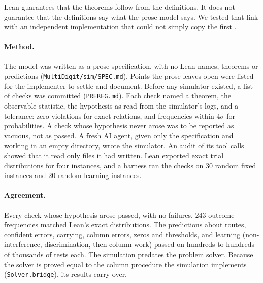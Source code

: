 \documentclass[11pt]{article}
\newcommand{\code}[1]{\texttt{#1}}
\newcommand{\lean}[1]{\texttt{#1}}
\begin{document}
Lean guarantees that the theorems follow from the definitions. It does not guarantee that the definitions say what the prose model says. We tested that link with an independent implementation that could not simply copy the first \citep[cf. N-version programming,][]{avizienis1985}.

\paragraph{Method.} The model was written as a prose specification, with no Lean names, theorems or predictions (\code{MultiDigit/sim/SPEC.md}). Points the prose leaves open were listed for the implementer to settle and document. Before any simulator existed, a list of checks was committed (\code{PREREG.md}). Each check named a theorem, the observable statistic, the hypothesis as read from the simulator's logs, and a tolerance: zero violations for exact relations, and frequencies within $4\sigma$ for probabilities. A check whose hypothesis never arose was to be reported as vacuous, not as passed. A fresh AI agent, given only the specification and working in an empty directory, wrote the simulator. An audit of its tool calls showed that it read only files it had written. Lean exported exact trial distributions for four instances, and a harness ran the checks on 30 random fixed instances and 20 random learning instances.

\paragraph{Agreement.} Every check whose hypothesis arose passed, with no failures. 243 outcome frequencies matched Lean's exact distributions. The predictions about routes, confident errors, carrying, column errors, zeros and thresholds, and learning (non-interference, discrimination, then column work) passed on hundreds to hundreds of thousands of tests each. The simulation predates the problem solver. Because the solver is proved equal to the column procedure the simulation implements (\lean{Solver.bridge}), its results carry over.
\end{document}
